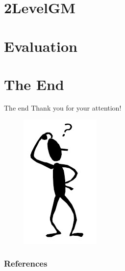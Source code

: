 \documentclass[hyperref={pdfpagelabels=false}]{beamer}
\begin{document}
\section{2LevelGM} 


\section{Evaluation} 

\section*{The End}
\begin{frame}{The end}
\centering
\LARGE
\color{red}
Thank you for your attention!
\nocite{Cho_LearningG}
\end{frame}
\begin{frame}
\centering
\begin{figure}
	\includegraphics{who.png}
\end{figure}
\end{frame}
\begin{frame}[allowframebreaks]
	\frametitle{References}
	
	
\end{frame} 
\end{document}
